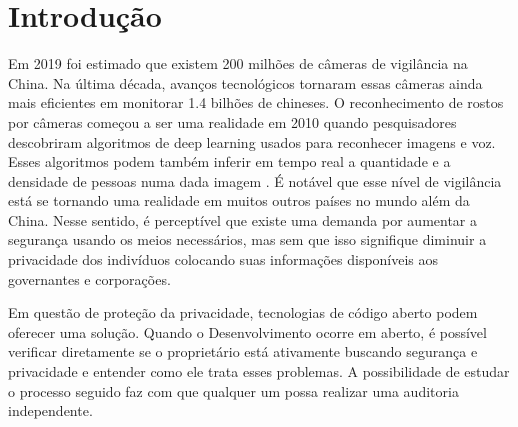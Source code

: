 \documentclass[12pt, %
openright, 
oneside, %
a4paper,    %
brazil]{facom-ufu-abntex2}
\begin{document}

\tableofcontents*
\cleardoublepage





\textual



\chapter[Introdução]{Introdução}
Em 2019 foi estimado que existem 200 milhões de câmeras de vigilância na China. Na última década,
avanços tecnológicos tornaram essas câmeras ainda mais eficientes em monitorar 1.4 bilhões de chineses. 
O reconhecimento de rostos por câmeras começou a ser uma realidade em 2010 quando pesquisadores 
descobriram algoritmos de deep learning usados para reconhecer imagens e voz. Esses algoritmos podem
também inferir em tempo real a quantidade e a densidade de pessoas numa dada imagem
\cite{qiang2019road}. É notável que esse nível de vigilância está se tornando uma realidade em muitos outros
países no mundo além da China. Nesse sentido, é perceptível que existe uma demanda por aumentar a segurança usando os meios 
necessários, mas sem que isso signifique diminuir a privacidade dos indivíduos colocando suas informações disponíveis aos 
governantes e corporações.

Em questão de proteção da privacidade, tecnologias de código aberto podem oferecer uma solução. Quando o Desenvolvimento
ocorre em aberto, é possível verificar diretamente se o proprietário está ativamente buscando segurança e privacidade e
entender como ele trata esses problemas. A possibilidade de estudar o processo seguido faz com que qualquer um possa
realizar uma auditoria independente. \cite{mardjan2016open}
\end{document}
